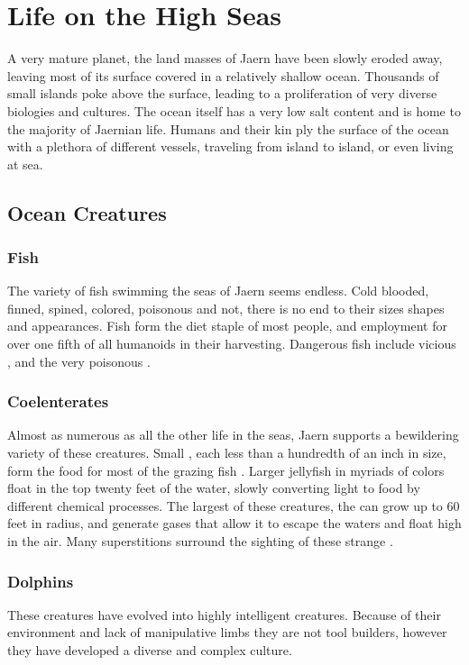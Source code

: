 \chapter{Life on the High Seas}
\label{ch:high-seas}
\setlength{\columnsep}{\defcolwidth}
\begin{multicols*}{2}
A very mature planet, the land masses of Jaern have been slowly eroded away, leaving most of its surface covered in a relatively shallow ocean. Thousands of small islands poke above the surface, leading to a proliferation of very diverse biologies and cultures. The ocean itself has a very low salt content and is home to the majority of Jaernian life. Humans and their kin ply the surface of the ocean with a plethora of different vessels, traveling from island to island, or even living at sea.
\section{Ocean Creatures}
\subsection{Fish}
The variety of fish swimming the seas of Jaern seems endless. Cold blooded, finned, spined, colored, poisonous and not, there is no end to their sizes shapes and appearances. Fish form the diet staple of most people, and employment for over one fifth of all humanoids in their harvesting. Dangerous fish include vicious , and the very poisonous .
\subsection{Coelenterates}
Almost as numerous as all the other life in the seas, Jaern supports a bewildering variety of these creatures. Small , each less than a hundredth of an inch in size, form the food for most of the grazing fish . Larger jellyfish in myriads of colors float in the top twenty feet of the water, slowly converting light to food by different chemical  processes. The largest of these creatures, the  can grow up to 60 feet in radius, and generate gases that allow it to escape the waters and float high in the air. Many superstitions surround the sighting of these strange . 
\subsection{Dolphins}
These creatures have evolved into highly intelligent creatures. Because of their environment and lack of manipulative limbs they are not tool builders, however they have developed a diverse and complex culture.


\end{multicols*}
